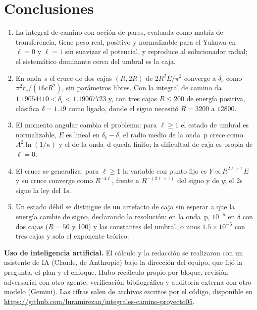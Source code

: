\documentclass[10pt,letterpaper]{article}
\newcommand{\dc}{\delta_c}
\newcommand{\ee}[2]{#1\times10^{#2}}
\begin{document}
\section{Conclusiones}
\begin{enumerate}[leftmargin=*,itemsep=1pt,topsep=2pt]
\item La integral de camino con acción de pares, evaluada como matriz de transferencia, tiene peso real, positivo y normalizable para el Yukawa en $\ell=0$ y $\ell=1$ sin suavizar el potencial, y reproduce al solucionador radial; el sistemático dominante cerca del umbral es la caja.
\item En onda~s el cruce de dos cajas $(R,2R)$ de $2R^2E/\pi^2$ converge a $\dc$ como $\pi^2r_e/(16cR^2)$, sin parámetros libres. Con la integral de camino da $1.19054410<\dc<1.19067723$ y, con tres cajas $R\le200$ de energía positiva, clasifica $\delta=1.19$ como ligado, donde el signo necesitó $R=3200$ a $12800$.
\item El momento angular cambia el problema: para $\ell\ge1$ el estado de umbral es normalizable, $E$ es lineal en $\dc-\delta$, el radio medio de la onda~p crece como $A^2\ln(1/\kappa)$ y el de la onda~d queda finito; la dificultad de caja es propia de $\ell=0$.
\item El cruce se generaliza: para $\ell\ge1$ la variable con punto fijo es $Y\propto R^{2\ell+1}E$ y su cruce converge como $R^{-4\ell}$, frente a $R^{-(2\ell+1)}$ del signo y de $y$; el 2s sigue la ley del 1s.
\item Un estado débil se distingue de un artefacto de caja sin esperar a que la energía cambie de signo, declarando la resolución: en la onda~p, $10^{-5}$ en $\delta$ con dos cajas ($R=50$ y 100) y las constantes del umbral, o unos $\ee{1.5}{-6}$ con tres cajas y solo el exponente teórico.
\end{enumerate}

\noindent\textsf{\textbf{Uso de inteligencia artificial.}} El cálculo y la redacción se realizaron con un asistente de IA (Claude, de Anthropic) bajo la dirección del equipo, que fijó la pregunta, el plan y el enfoque. Hubo recálculo propio por bloque, revisión adversarial con otro agente, verificación bibliográfica y auditoría externa con otro modelo (Gemini). Las cifras salen de archivos escritos por el código, disponible en \url{https://github.com/luramirezan/integrales-camino-proyecto05}.
\end{document}
